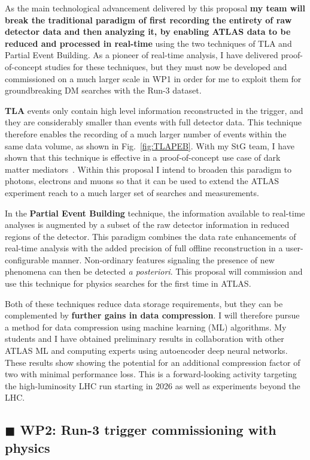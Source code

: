 \documentclass[11pt,a4paper]{article}
\begin{document}
As the main technological advancement delivered by this proposal \textbf{my team will break the traditional paradigm of first recording the entirety of raw detector data and then analyzing it, by enabling ATLAS data to be reduced and processed in real-time} using the two techniques of TLA and Partial Event Building. As a pioneer of real-time analysis, I have delivered proof-of-concept studies for these techniques, but they must now be developed and commissioned on a much larger scale in WP1 in order for me to exploit them for groundbreaking DM searches with the Run-3 dataset.

\textbf{TLA} events only contain high level information reconstructed in the trigger, and they are considerably smaller than events with full detector data. 
This technique therefore enables the recording of a much larger number of events within the same data volume, as shown in Fig.~\ref{fig:TLAPEB}.  
With my StG team, I have shown that this technique is effective in a proof-of-concept use case of dark matter mediators~\cite{Aaboud:2018fzt}. 
Within this proposal I intend to broaden this paradigm to photons, electrons and muons so that it can be used to extend the ATLAS experiment reach to a much larger set of searches and measurements. 

In the \textbf{Partial Event Building} technique, the information available to real-time analyses is augmented by a subset of the raw detector information in reduced regions of the detector. This paradigm combines the data rate enhancements of real-time analysis with the added precision of full offline reconstruction in a user-configurable manner. 
Non-ordinary features signaling the presence of new phenomena can then be detected \textit{a posteriori}. 
This proposal will commission and use this technique for physics searches for the first time in ATLAS. 

Both of these techniques reduce data storage requirements, but they can be complemented by \textbf{further gains in data compression}. I will therefore pursue a method for data compression using machine learning (ML) algorithms. My students and I have obtained preliminary results in collaboration with other ATLAS ML and computing experts using autoencoder deep neural networks. These results show showing the potential for an additional compression factor of two with minimal performance loss. This is a forward-looking activity targeting the high-luminosity LHC run starting in 2026 as well as experiments beyond the LHC.

\subsection*{\color{green} $\blacksquare$ \color{black} WP2: Run-3 trigger commissioning with physics}
\end{document}

